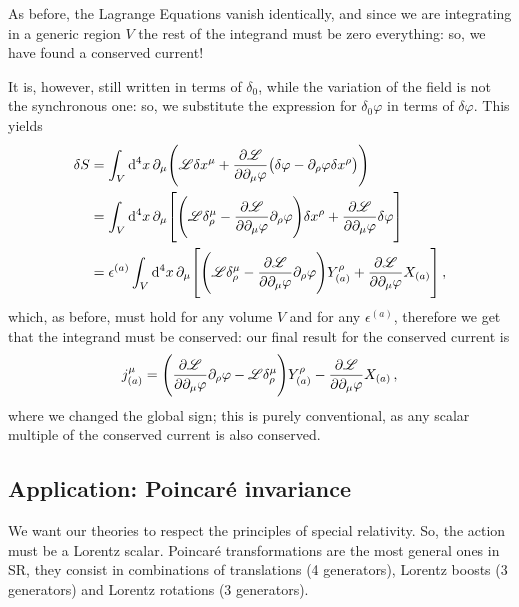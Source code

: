 \documentclass[main.tex]{subfiles}
\begin{document}
As before, the Lagrange Equations vanish identically, and since we are integrating in a generic region \(V\) the rest of the integrand must be zero everything: so, we have found a conserved current! 

It is, however, still written in terms of \(\delta_0 \), while the variation of the field is not the synchronous one: so, we substitute the expression for \(\delta_0 \varphi \) in terms of \(\delta \varphi \). This yields 
%
\begin{subequations}
\begin{align}
\delta S &=
\int_{V} \dd[4]{x} \partial_{\mu } \qty(\mathscr{L} \delta x^{\mu } + \pdv{\mathscr{L}}{\partial_{\mu } \varphi } \qty(\delta \varphi - \partial_{\rho  } \varphi \delta x^{\rho })  )  \\
&= \int_{V} \dd[4]{x} \partial_{\mu } \qty[ \qty(\mathscr{L} \delta^{\mu }_{\rho } - \pdv{\mathscr{L}}{\partial_{\mu } \varphi } \partial_{\rho } \varphi ) \delta x^{\rho }+ \pdv{\mathscr{L}}{\partial_{\mu }\varphi } \delta \varphi ]  \\
&= \epsilon^{(a)}\int_{V} \dd[4]{x} \partial_{\mu } \qty[ \qty(\mathscr{L} \delta^{\mu }_{\rho } - \pdv{\mathscr{L}}{\partial_{\mu } \varphi } \partial_{\rho } \varphi ) Y^{\rho }_{(a)}+ \pdv{\mathscr{L}}{\partial_{\mu }\varphi } X_{(a)} ]
\,,
\end{align}
\end{subequations}
%
which, as before, must hold for any volume \(V\) and for any \(\epsilon^{(a)}\), therefore we get that the integrand must be conserved: our final result for the conserved current is 
%
\begin{align}
j^{\mu }_{(a)} = \qty(\pdv{\mathscr{L}}{\partial_{\mu } \varphi } \partial_{\rho } \varphi  - \mathscr{L} \delta^{\mu }_{\rho } ) Y^{\rho }_{(a)}-  \pdv{\mathscr{L}}{\partial_{\mu }\varphi } X_{(a)}
\,,
\end{align}
%
where we changed the global sign; this is purely conventional, as any scalar multiple of the conserved current is also conserved.

\subsection{Application: Poincaré invariance} \label{sec:poincare-invariance-noether}

We want our theories to respect the principles of special relativity. So, the action must be a Lorentz scalar. 
Poincaré transformations are the most general ones in SR, they consist in combinations of translations (4 generators), Lorentz boosts (3 generators) and Lorentz rotations (3 generators).
\end{document}
